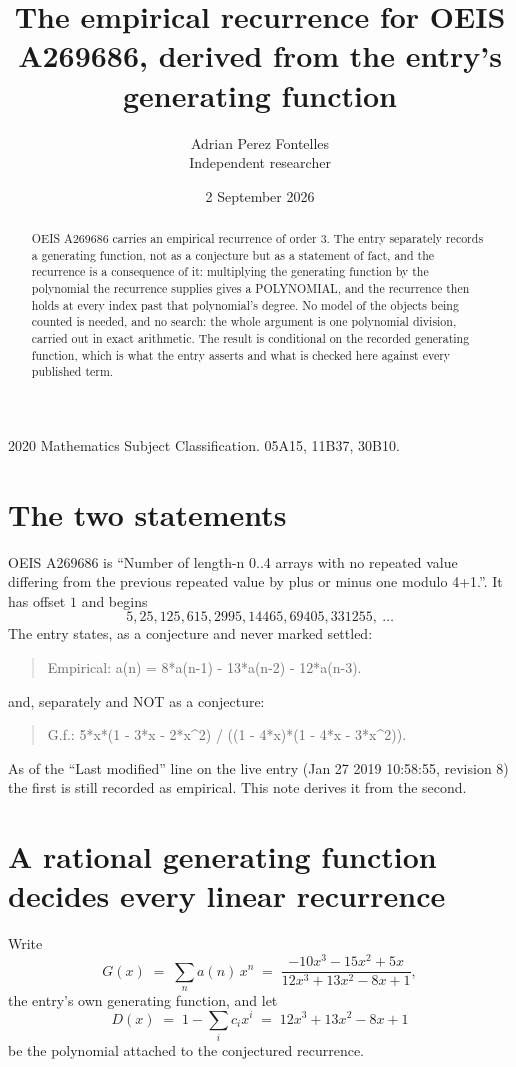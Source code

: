 \documentclass[11pt,a4paper]{article}
\title{The empirical recurrence for OEIS A269686, derived from the entry's generating function}
\author{Adrian Perez Fontelles\\ \small Independent researcher}
\date{2 September 2026}
\theoremstyle{plain}
\theoremstyle{definition}
\begin{document}
\maketitle

\begin{abstract}
OEIS A269686 carries an empirical recurrence of order $3$. The entry separately records a
generating function, not as a conjecture but as a statement of fact, and the recurrence is a
consequence of it: multiplying the generating function by the polynomial the recurrence
supplies gives a POLYNOMIAL, and the recurrence then holds at every index past that
polynomial's degree. No model of the objects being counted is needed, and no search: the
whole argument is one polynomial division, carried out in exact arithmetic. The result is
conditional on the recorded generating function, which is what the entry asserts and what is
checked here against every published term.
\end{abstract}

\noindent\small 2020 Mathematics Subject Classification. 05A15, 11B37, 30B10.\normalsize

\section{The two statements}

OEIS A269686 is ``Number of length-n 0..4 arrays with no repeated value differing from the previous repeated value by plus or minus one modulo 4+1.''. It has offset $1$ and begins
\[
5, 25, 125, 615, 2995, 14465, 69405, 331255,\ \dots
\]
The entry states, as a conjecture and never marked settled:
\begin{quote}
Empirical: a(n) = 8*a(n-1) - 13*a(n-2) - 12*a(n-3).
\end{quote}
and, separately and NOT as a conjecture:
\begin{quote}
G.f.: 5*x*(1 - 3*x - 2*x\^{}2) / ((1 - 4*x)*(1 - 4*x - 3*x\^{}2)).
\end{quote}
As of the ``Last modified'' line on the live entry (Jan 27 2019 10:58:55, revision 8) the first is still
recorded as empirical. This note derives it from the second.

\section{A rational generating function decides every linear recurrence}

Write
\[
G(x)\;=\;\sum_{n}a(n)\,x^{n}\;=\;\frac{- 10 x^{3} - 15 x^{2} + 5 x}{12 x^{3} + 13 x^{2} - 8 x + 1},
\]
the entry's own generating function, and let
\[
D(x)\;=\;1-\sum_i c_i x^{i}\;=\;12 x^{3} + 13 x^{2} - 8 x + 1
\]
be the polynomial attached to the conjectured recurrence.
\end{document}
